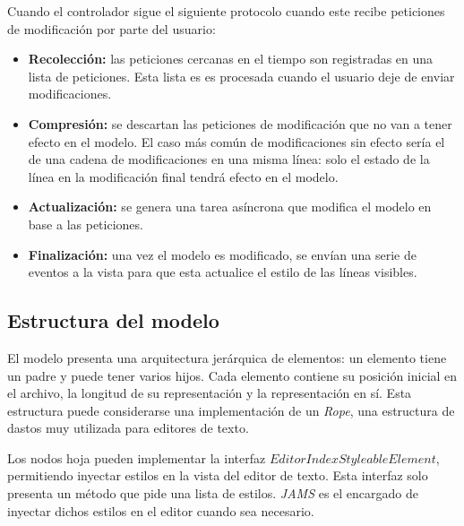 Cuando el controlador sigue el siguiente
protocolo cuando este recibe peticiones de modificación
por parte del usuario:
\begin{itemize}
    \item \textbf{Recolección:} las peticiones cercanas
    en el tiempo son registradas en una lista de peticiones.
    Esta lista es es procesada cuando el usuario deje
    de enviar modificaciones.
    \item \textbf{Compresión:} se descartan las peticiones
    de modificación que no van a tener efecto en el modelo.
    El caso más común de modificaciones sin efecto sería
    el de una cadena de modificaciones en una misma línea:
    solo el estado de la línea en la modificación final
    tendrá efecto en el modelo.
    \item \textbf{Actualización:} se genera una tarea
    asíncrona que modifica el modelo en base a las
    peticiones.
    \item \textbf{Finalización:} una vez el modelo
    es modificado, se envían una serie de eventos
    a la vista para que esta actualice el estilo
    de las líneas visibles.
\end{itemize}

\subsection{Estructura del modelo}\label{subsec:estructura-del-modelo}

El modelo presenta una arquitectura jerárquica de elementos:
un elemento tiene un padre y puede tener varios hijos.
Cada elemento contiene su posición inicial en el archivo, la
longitud de su representación y la representación en sí.
Esta estructura puede considerarse una implementación de un
\textit{Rope}\cite{ROPES}, una estructura de dastos muy
utilizada para editores de texto.

\begin{center}
\end{center}

\noindent Los nodos hoja pueden implementar la interfaz
$EditorIndexStyleableElement$, permitiendo inyectar
estilos en la vista del editor de texto.
Esta interfaz solo presenta un método que pide una lista
de estilos.
\textit{JAMS} es el encargado de inyectar dichos estilos
en el editor cuando sea necesario.


